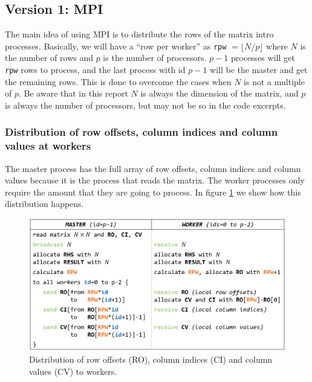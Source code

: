 \documentclass[12pt,reqno]{amsart}
\newcommand{\code}[1]{\texttt{#1}}
\begin{document}
\subsection{Version 1: MPI}
The main idea of using MPI is to distribute the rows of the matrix intro processes. Basically, we will have a ``row per worker'' as \code{rpw} $=\lfloor N/p\rfloor$ where $N$ is the number of rows and $p$ is the number of processors. $p-1$ processes will get \code{rpw} rows to process, and the last process with id $p-1$ will be the master and get the remaining rows. This is done to overcome the cases when $N$ is not a multiple of $p$. Be aware that in this report $N$ is always the dimension of the matrix, and $p$ is always the number of processors, but may not be so in the code excerpts.

\subsubsection{Distribution of row offsets, column indices and column values at workers}
The master process has the full array of row offsets, column indices and column values because it is the process that reads the matrix. The worker processes only require the amount that they are going to process. In figure \ref{fig:allocs} we show how this distribution happens.

\begin{figure}[h]
\centering
\includegraphics[width=\linewidth]{allocs.png}
\caption{Distribution of row offsets (RO), column indices (CI) and column values (CV) to workers.}
\label{fig:allocs}
\end{figure}
\end{document}
